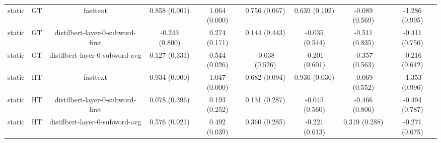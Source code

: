 \begin{sidewaystable}[htb]
\begin{tabular}{@{}ccccccccc@{}}
        static & GT & fasttext & 0.858 (0.001) & 1.064 (0.000) & 0.756 (0.067) & 0.639 (0.102) & -0.089 (0.569) & -1.286 (0.995) \\
        static & GT & distilbert-layer-0-subword-first & -0.243 (0.800) & 0.274 (0.171) & 0.144 (0.443) & -0.035 (0.544) & -0.511 (0.835) & -0.411 (0.756) \\
        static & GT & distilbert-layer-0-subword-avg & 0.127 (0.331) & 0.544 (0.026) & -0.038 (0.526) & -0.201 (0.601) & -0.357 (0.563) & -0.216 (0.642) \\
        static & HT & fasttext & 0.934 (0.000) & 1.047 (0.000) & 0.682 (0.094) & 0.936 (0.030) & -0.069 (0.552) & -1.353 (0.996) \\
        static & HT & distilbert-layer-0-subword-first & 0.078 (0.396) & 0.193 (0.252) & 0.131 (0.287) & -0.045 (0.560) & -0.466 (0.806) & -0.494 (0.787) \\
        static & HT & distilbert-layer-0-subword-avg & 0.576 (0.021) & 0.492 (0.039) & 0.360 (0.285) & -0.221 (0.613) & 0.319 (0.288) & -0.271 (0.675) \\
        \bottomrule
    \end{tabular}
\end{sidewaystable}
